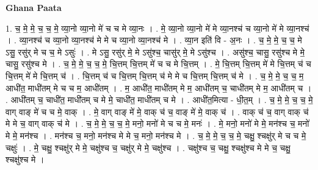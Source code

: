 \documentclass[17pt]{extarticle}
\begin{document}
\textbf{Ghana Paata } \newline

1. च॒ मे॒ मे॒ च॒ च॒ मे॒ व्या॒नो व्या॒नो मे॑ च च मे व्या॒नः । . मे॒ व्या॒नो व्या॒नो मे॑ मे व्या॒नश्च॑ च व्या॒नो मे॑ मे व्या॒नश्च॑ । . व्या॒नश्च॑ च व्या॒नो व्या॒नश्च॑ मे मे च व्या॒नो व्या॒नश्च॑ मे । . व्या॒न इति॑ वि - अ॒नः । . च॒ मे॒ मे॒ च॒ च॒ मे ऽसु॒ रसु॑र् मे च च॒ मे ऽसुः॑ । . मे ऽसु॒ रसु॑र् मे॒ मे ऽसु॑श्च॒ चासु॑र् मे॒ मे ऽसु॑श्च । . असु॑श्च॒ चासु॒ रसु॑श्च मे मे॒ चासु॒ रसु॑श्च मे । . च॒ मे॒ मे॒ च॒ च॒ मे॒ चि॒त्तम् चि॒त्तम् मे॑ च च मे चि॒त्तम् । . मे॒ चि॒त्तम् चि॒त्तम् मे॑ मे चि॒त्तम् च॑ च चि॒त्तम् मे॑ मे चि॒त्तम् च॑ । . चि॒त्तम् च॑ च चि॒त्तम् चि॒त्तम् च॑ मे मे च चि॒त्तम् चि॒त्तम् च॑ मे । . च॒ मे॒ मे॒ च॒ च॒ म॒ आधी॑त॒ माधी॑तम् मे च च म॒ आधी॑तम् । . म॒ आधी॑त॒ माधी॑तम् मे म॒ आधी॑तम् च॒ चाधी॑तम् मे म॒ आधी॑तम् च । . आधी॑तम् च॒ चाधी॑त॒ माधी॑तम् च मे मे॒ चाधी॑त॒ माधी॑तम् च मे । . आधी॑त॒मित्या - धी॒त॒म् । . च॒ मे॒ मे॒ च॒ च॒ मे॒ वाग् वाङ् मे॑ च च मे॒ वाक् । . मे॒ वाग् वाङ् मे॑ मे॒ वाक् च॑ च॒ वाङ् मे॑ मे॒ वाक् च॑ । . वाक् च॑ च॒ वाग् वाक् च॑ मे मे च॒ वाग् वाक् च॑ मे । . च॒ मे॒ मे॒ च॒ च॒ मे॒ मनो॒ मनो॑ मे च च मे॒ मनः॑ । . मे॒ मनो॒ मनो॑ मे मे॒ मन॑श्च च॒ मनो॑ मे मे॒ मन॑श्च । . मन॑श्च च॒ मनो॒ मन॑श्च मे मे च॒ मनो॒ मन॑श्च मे । . च॒ मे॒ मे॒ च॒ च॒ मे॒ चक्षु॒ श्चक्षु॑र् मे च च मे॒ चक्षुः॑ । . मे॒ चक्षु॒ श्चक्षु॑र् मे मे॒ चक्षु॑श्च च॒ चक्षु॑र् मे मे॒ चक्षु॑श्च । . चक्षु॑श्च च॒ चक्षु॒ श्चक्षु॑श्च मे मे च॒ चक्षु॒ श्चक्षु॑श्च मे । \newline
\end{document}
